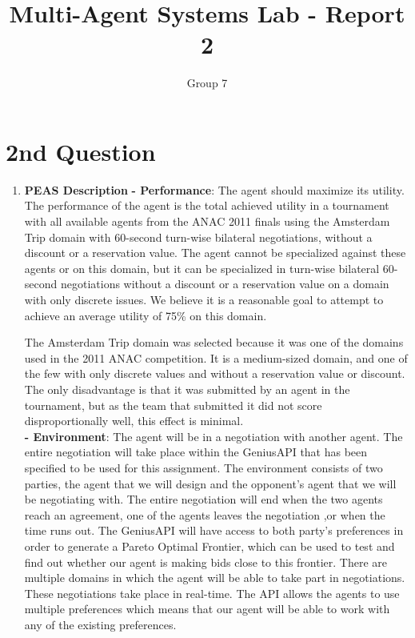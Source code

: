 \documentclass{article}
\title{Multi-Agent Systems Lab - Report 2}
\author{Group 7}
\begin{document}
\maketitle

\section{2nd Question}

\begin{enumerate}[label=(\alph*)]
\item
\textbf{PEAS Description}
\newline
\textbf{- Performance}: The agent should maximize its utility. The performance of the agent is the total achieved utility in a tournament with all available agents from the ANAC 2011 finals using the Amsterdam Trip domain with 60-second turn-wise bilateral negotiations, without a discount or a reservation value. The agent cannot be specialized against these agents or on this domain, but it can be specialized in turn-wise bilateral 60-second negotiations without a discount or a reservation value on a domain with only discrete issues. We believe it is a reasonable goal to attempt to achieve an average utility of 75\% on this domain.

\quad The Amsterdam Trip domain was selected because it was one of the domains used in the 2011 ANAC competition. It is a medium-sized domain, and one of the few with only discrete values and without a reservation value or discount. The only disadvantage is that it was submitted by an agent in the tournament, but as the team that submitted it did not score disproportionally well, this effect is minimal.\\

\textbf{- Environment}: The agent will be in a negotiation with another agent. The entire negotiation will take place within the GeniusAPI that has been specified to be used for this assignment. The environment consists of two parties, the agent that we will design and the opponent's agent that we will be negotiating with. The entire negotiation will end when the two agents reach an agreement, one of the agents leaves the negotiation ,or when the time runs out. The GeniusAPI will have access to both party's preferences in order to generate a Pareto Optimal Frontier, which can be used to test and find out whether our agent is making bids close to this frontier. There are multiple domains in which the agent will be able to take part in negotiations. These negotiations take place in real-time. The API allows the agents to use multiple preferences which means that our agent will be able to work with any of the existing preferences.\\ 


\end{enumerate}
\end{document}

